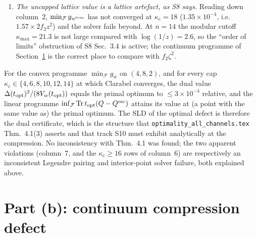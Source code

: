\documentclass[11pt]{article}
\begin{document}
\begin{enumerate}[leftmargin=1.6em,itemsep=2pt]
is unaffected: that number is a rigorous upper bound evaluated at the point actually produced.)
Away from $\kappa_c=8$ the stored point degrades fast --- at $\kappa_c=21.28$ it gives
$g_{w^{\rm true}}=5.0\times10^{-2}$, i.e.\ $420\times$ the true optimum: the capped optimiser
does dump defect into the ultraviolet, exactly as S8's Sec.~3.4 predicts.
\item \emph{The uncapped lattice value is a lattice artefact, as S8 says.}  Reading down
column~2, $\min_{\mathcal F}g_{w^{\rm true}}$ has not converged at $\kappa_c=18$
($1.35\times10^{-4}$, i.e.\ $1.57\times2f_2z^2$) and the solver fails beyond.  At $n=14$ the
modular cutoff $\kappa_{\max}=21.3$ is not large compared with $\log(1/z)=2.6$, so the ``order of
limits'' obstruction of S8 Sec.~3.4 is active; the continuum programme of Section~\ref{sec:continuum}
is the correct place to compare with $f_2\zeta^2$.
\end{enumerate}

\begin{verdictok}
For the convex programme $\min_{\mathcal F}g_w$ on $(4,8,2)$, and for every cap
$\kappa_c\in\{4,6,8,10,12,14\}$ at which Clarabel converges, the dual value
$\Delta(t_{\rm opt})^2/(8V_w(t_{\rm opt}))$ equals the primal optimum to
$\le3\times10^{-4}$ relative, and the linear programme $\inf_{\mathcal F}\operatorname{Tr} t_{\rm opt}(Q-Q^{\rm rec})$
attains its value at (a point with the same value as) the primal optimum.  The SLD of the optimal
defect is therefore the dual certificate, which is the structure that
\texttt{optimality\_all\_channels.tex} Thm.~4.1(3) asserts and that track S10 must exhibit
analytically at the compression.  No inconsistency with Thm.~4.1 was found; the two apparent
violations (column~7, and the $\kappa_c\ge16$ rows of column~6) are respectively an inconsistent
Legendre pairing and interior-point solver failure, both explained above.
\end{verdictok}


\section{Part (b): continuum compression defect}
\label{sec:continuum}
\end{document}
